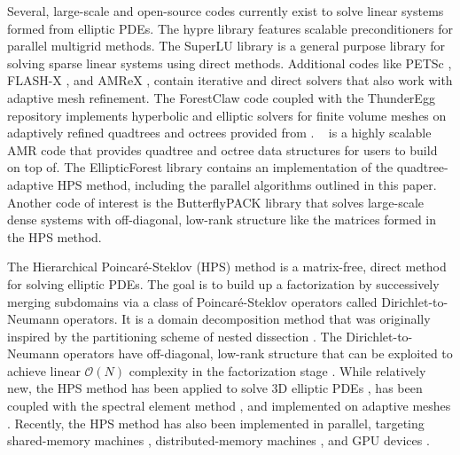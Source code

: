 Several, large-scale and open-source codes currently exist to solve linear systems formed from elliptic PDEs. The hypre library \cite{falgout2002hypre} features scalable preconditioners for parallel multigrid methods. The SuperLU library \cite{li2005superlu} is a general purpose library for solving sparse linear systems using direct methods. Additional codes like PETSc \cite{anl2023petsc}, FLASH-X \cite{dubey2022flash}, and AMReX \cite{zhang2019amrex}, contain iterative and direct solvers that also work with adaptive mesh refinement. The ForestClaw code \cite{calhoun2017forestclaw} coupled with the ThunderEgg repository \cite{aiton2022thunderegg} implements hyperbolic and elliptic solvers for finite volume meshes on adaptively refined quadtrees and octrees provided from \pforest. \pforest\ \cite{burstedde2011p4est,burstedde2020parallel} is a highly scalable AMR code that provides quadtree and octree data structures for users to build on top of. The EllipticForest library \cite{chipman2024ellipticforest} contains an implementation of the quadtree-adaptive HPS method, including the parallel algorithms outlined in this paper. Another code of interest is the ButterflyPACK library \cite{liu2018butterflypack} that solves large-scale dense systems with off-diagonal, low-rank structure like the matrices formed in the HPS method.

The Hierarchical Poincaré-Steklov (HPS) method \cite{martinsson2015hierarchical, gillman2014direct} is a matrix-free, direct method for solving elliptic PDEs. The goal is to build up a factorization by successively merging subdomains via a class of Poincar\'e-Steklov operators \cite{quarteroni1991theory} called Dirichlet-to-Neumann operators. It is a domain decomposition method that was originally inspired by the partitioning scheme of nested dissection \cite{george1973nested,lipton1979generalized}. The Dirichlet-to-Neumann operators have off-diagonal, low-rank structure that can be exploited to achieve linear $\mathcal{O}(N)$ complexity in the factorization stage \cite{gillman2014direct}. While relatively new, the HPS method has been applied to solve 3D elliptic PDEs \cite{hao2016direct}, has been coupled with the spectral element method \cite{fortunato2020ultraspherical}, and implemented on adaptive meshes \cite{babb2018accelerated, geldermans2019adaptive,chipman2024fast}. Recently, the HPS method has also been implemented in parallel, targeting shared-memory machines \cite{beams2020parallel}, distributed-memory machines \cite{yesypenko2022parallel}, and GPU devices \cite{yesypenko2022gpu}.

